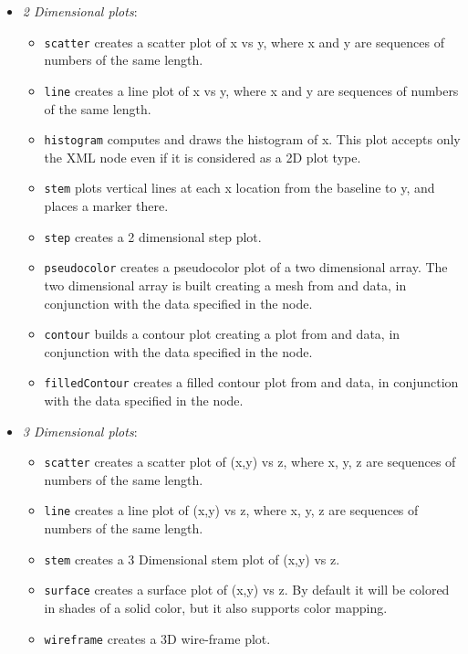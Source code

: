  \begin{itemize}
  \item \textit{2 Dimensional plots}:
  \begin{itemize}
    \item \texttt{scatter} creates a scatter plot of x vs y, where x and y are
    sequences of numbers of the same length.
    \item \texttt{line} creates a line plot of x vs y, where x and y are
    sequences of numbers of the same length.
    \item \texttt{histogram} computes and draws the histogram of x.
    \nb This plot accepts only the XML node  even if it
    is considered as a 2D plot type.
    \item \texttt{stem} plots vertical lines at each x location from the
    baseline to y, and places a marker there.
    \item \texttt{step} creates a 2 dimensional step plot.
    \item \texttt{pseudocolor} creates a pseudocolor plot of a two dimensional
    array.
    The two dimensional array is built creating a mesh from  and
     data, in conjunction with the data specified in the
     node.
    \item \texttt{contour} builds a contour plot creating a plot from
     and  data, in conjunction with the data specified in
    the  node.
    \item \texttt{filledContour} creates a filled contour plot from 
    and  data, in conjunction with the data specified in the
     node.
  \end{itemize}
  \item \textit{3 Dimensional plots}:
  \begin{itemize}
    \item \texttt{scatter} creates a scatter plot of (x,y) vs z, where x, y, z
    are sequences of numbers of the same length.
    \item \texttt{line} creates a line plot of (x,y) vs z, where x, y, z are
    sequences of numbers of the same length.
    \item \texttt{stem} creates a 3 Dimensional stem plot of (x,y) vs z.
    \item \texttt{surface} creates a surface plot of (x,y) vs z.
    By default it will be colored in shades of a solid color, but it also
    supports color mapping.
    \item \texttt{wireframe} creates a 3D wire-frame plot.

\end{itemize}
\end{itemize}
